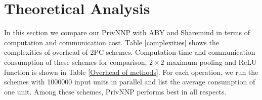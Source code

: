 \documentclass[letterpaper]{article} %
\begin{document}
    \section{Theoretical Analysis}
    In this section we compare our PrivNNP with ABY and Sharemind
    in terms of computation and communication cost.
    Table \ref{complexities} shows the complexities of
    overhead of 2PC schemes.
    Computation time and communication consumption of these schemes for
     comparison, $2\times 2$ maximum pooling
    and ReLU function is shown in Table \ref{Overhead of methods}.
    For each operation, we run the schemes with 1000000 input units in parallel and
    list the average consumption of one unit.
    Among these schemes, PrivNNP performs best in all respects.
    \begin{table}[!ht]
        \caption{consumptions of different 2PC-comparison schemes with $l$-bits value inputs and  asymmetric security parameters $\kappa$ }
        \label{complexities}
    \end{table}
\end{document}
